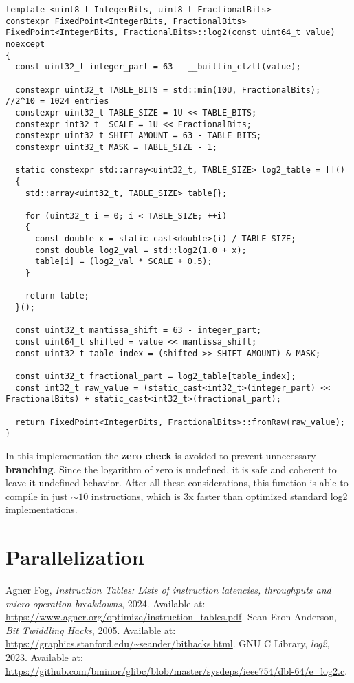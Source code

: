 \documentclass[11pt]{article}
\begin{document}
\newpage
\begin{verbatim}
template <uint8_t IntegerBits, uint8_t FractionalBits>
constexpr FixedPoint<IntegerBits, FractionalBits> FixedPoint<IntegerBits, FractionalBits>::log2(const uint64_t value) noexcept
{
  const uint32_t integer_part = 63 - __builtin_clzll(value);

  constexpr uint32_t TABLE_BITS = std::min(10U, FractionalBits); //2^10 = 1024 entries
  constexpr uint32_t TABLE_SIZE = 1U << TABLE_BITS;
  constexpr int32_t  SCALE = 1U << FractionalBits;
  constexpr uint32_t SHIFT_AMOUNT = 63 - TABLE_BITS;
  constexpr uint32_t MASK = TABLE_SIZE - 1;

  static constexpr std::array<uint32_t, TABLE_SIZE> log2_table = []()
  {
    std::array<uint32_t, TABLE_SIZE> table{};

    for (uint32_t i = 0; i < TABLE_SIZE; ++i)
    {
      const double x = static_cast<double>(i) / TABLE_SIZE;
      const double log2_val = std::log2(1.0 + x);
      table[i] = (log2_val * SCALE + 0.5);
    }

    return table;
  }();

  const uint32_t mantissa_shift = 63 - integer_part;
  const uint64_t shifted = value << mantissa_shift;
  const uint32_t table_index = (shifted >> SHIFT_AMOUNT) & MASK;

  const uint32_t fractional_part = log2_table[table_index];
  const int32_t raw_value = (static_cast<int32_t>(integer_part) << FractionalBits) + static_cast<int32_t>(fractional_part);

  return FixedPoint<IntegerBits, FractionalBits>::fromRaw(raw_value);
}
\end{verbatim}
In this implementation the \textbf{zero check} is avoided to prevent unnecessary \textbf{branching}. Since the logarithm of zero is undefined, it is safe and coherent to leave it undefined behavior. After all these considerations, this function is able to compile in just $\sim{10}$ instructions, which is 3x faster than optimized standard log2 implementations\textsuperscript{\cite{libc_log2}}.

\section{Parallelization}

\begin{thebibliography}{9}

Agner Fog, \textit{Instruction Tables: Lists of instruction latencies, throughputs and micro-operation breakdowns}, 2024. Available at: \url{https://www.agner.org/optimize/instruction_tables.pdf}.
Sean Eron Anderson, \textit{Bit Twiddling Hacks}, 2005. Available at: \url{https://graphics.stanford.edu/~seander/bithacks.html}.
GNU C Library, \textit{log2}, 2023. Available at: \url{https://github.com/bminor/glibc/blob/master/sysdeps/ieee754/dbl-64/e_log2.c}.

\end{thebibliography}
\end{document}
